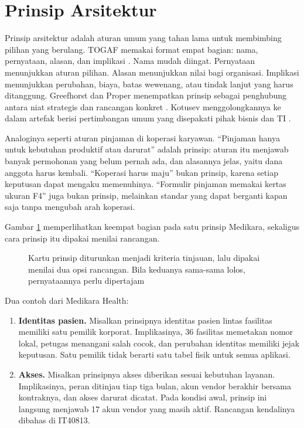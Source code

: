 \section{Prinsip Arsitektur}

Prinsip arsitektur adalah aturan umum yang tahan lama untuk membimbing pilihan
yang berulang. TOGAF memakai format empat bagian: nama, pernyataan, alasan, dan
implikasi \cite{togaf10}. Nama mudah diingat. Pernyataan menunjukkan aturan
pilihan. Alasan menunjukkan nilai bagi organisasi. Implikasi menunjukkan
perubahan, biaya, batas wewenang, atau tindak lanjut yang harus ditanggung.
Greefhorst dan Proper menempatkan prinsip sebagai penghubung antara niat strategis
dan rancangan konkret \cite{c03-greefhorst2011}. Kotusev menggolongkannya ke dalam
artefak berisi pertimbangan umum yang disepakati pihak bisnis dan TI
\cite{kotusev2021}.

Analoginya seperti aturan pinjaman di koperasi karyawan. ``Pinjaman hanya untuk
kebutuhan produktif atau darurat'' adalah prinsip: aturan itu menjawab banyak
permohonan yang belum pernah ada, dan alasannya jelas, yaitu dana anggota harus
kembali. ``Koperasi harus maju'' bukan prinsip, karena setiap keputusan dapat
mengaku memenuhinya. ``Formulir pinjaman memakai kertas ukuran F4'' juga bukan
prinsip, melainkan standar yang dapat berganti kapan saja tanpa mengubah arah
koperasi.

Gambar \ref{fig:ch03-anatomi-prinsip} memperlihatkan keempat bagian pada satu prinsip
Medikara, sekaligus cara prinsip itu dipakai menilai rancangan.

\begin{figure}[!htb]
  \centering
  
  \caption{Kartu prinsip diturunkan menjadi kriteria tinjauan, lalu dipakai menilai
           dua opsi rancangan. Bila keduanya sama-sama lolos, pernyataannya perlu
           dipertajam}
  \label{fig:ch03-anatomi-prinsip}
\end{figure}

Dua contoh dari Medikara Health:

\begin{enumerate}
  \item \textbf{Identitas pasien.} Misalkan prinsipnya identitas pasien lintas
        fasilitas memiliki satu pemilik korporat. Implikasinya, 36 fasilitas
        memetakan nomor lokal, petugas menangani salah cocok, dan perubahan
        identitas memiliki jejak keputusan. Satu pemilik tidak berarti satu tabel
        fisik untuk semua aplikasi.
  \item \textbf{Akses.} Misalkan prinsipnya akses diberikan sesuai kebutuhan
        layanan. Implikasinya, peran ditinjau tiap tiga bulan, akun vendor berakhir
        bersama kontraknya, dan akses darurat dicatat. Pada kondisi awal, prinsip ini
        langsung menjawab 17 akun vendor yang masih aktif. Rancangan kendalinya
        dibahas di IT40813.
\end{enumerate}

